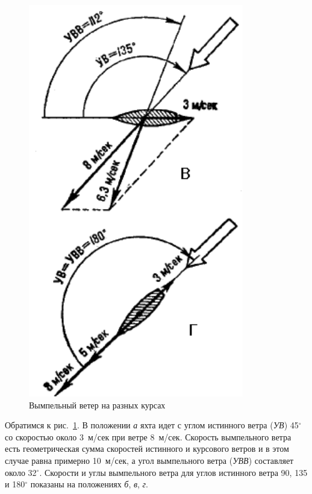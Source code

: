 \documentclass[a4paper, 12pt, twoside, final]{scrbook}
\begin{document}
\begin{figure}[htbp]
\begin{minipage}[c]{0.49\textwidth}
		\centering\includegraphics[scale=1]{90_2_Vympelnyj_veter}
	\end{minipage}
	\caption{Вымпельный ветер на разных курсах}
	\label{fig:90}
\end{figure}

Обратимся к рис.~\ref{fig:90}. В положении \textit{а} яхта идет с углом истинного ветра (\textit{УВ}) 45$^\circ$ со скоростью около 3~м/сек при ветре 8~м/сек. Скорость вымпельного ветра есть геометрическая сумма скоростей истинного и курсового ветров и в этом случае равна примерно 10~м/сек, а угол вымпельного ветра (\textit{УВВ}) составляет около 32$^\circ$. Скорости и углы вымпельного ветра для углов истинного ветра 90, 135 и 180$^\circ$ показаны на положениях \textit{б}, \textit{в}, \textit{г}.
\end{document}
